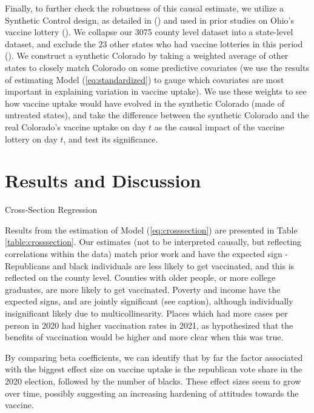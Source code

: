\documentclass[12pt]{article}
\begin{document}
\begin{spacing}{1.5}
		Finally, to further check the robustness of this causal estimate, we utilize a Synthetic Control design, as detailed in (\cite{abadie_using_2021}) and used in prior studies on Ohio's vaccine lottery (\cite{lang_did_2022}). We collapse our 3075 county level dataset into a state-level dataset, and exclude the 23 other states who had vaccine lotteries in this period (\cite{thirumurthy_association_2022}). We construct a synthetic Colorado by taking a weighted average of other states to closely match Colorado on some predictive covariates (we use the results of estimating Model (\ref{eq:standardized}) to gauge which covariates are most important in explaining variation in vaccine uptake). We use these weights to see how vaccine uptake would have evolved in the synthetic Colorado (made of untreated states), and take the difference between the synthetic Colorado and the real Colorado's vaccine uptake on day $t$ as the causal impact of the vaccine lottery on day $t$, and test its significance.
		
		\section{Results and Discussion}
		
		\begin{table}
			\centering
			\caption{Cross-Section Regression}
			\centerline{}
			\label{table:crosssection}
		\end{table}
		
		Results from the estimation of Model (\ref{eq:crosssection}) are presented in Table \ref{table:crosssection}. Our estimates (not to be interpreted causally, but reflecting correlations within the data) match prior work and have the expected sign - Republicans and black individuals are less likely to get vaccinated, and this is reflected on the county level. Counties with older people, or more college graduates, are more likely to get vaccinated. Poverty and income have the expected signs, and are jointly significant (see caption), although individually insignificant likely due to multicollinearity. Places which had more cases per person in 2020 had higher vaccination rates in 2021, as hypothesized that the benefits of vaccination would be higher and more clear when this was true.
		
		By comparing beta coefficients, we can identify that by far the factor associated with the biggest effect size on vaccine uptake is the republican vote share in the 2020 election, followed by the number of blacks. These effect sizes seem to grow over time, possibly suggesting an increasing hardening of attitudes towards the vaccine.
		

\end{spacing}
\end{document}
